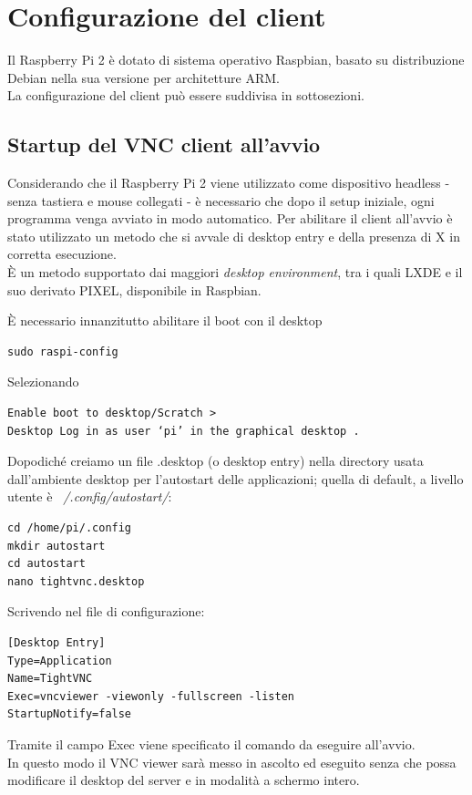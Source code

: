 \section{Configurazione del client}
Il Raspberry Pi 2 è dotato di sistema operativo Raspbian, basato su distribuzione Debian nella sua versione per architetture ARM. \\
La configurazione del client può essere suddivisa in sottosezioni.
\subsection{Startup del VNC client all'avvio}
Considerando che il Raspberry Pi 2 viene utilizzato come dispositivo headless - senza tastiera e mouse collegati - è necessario che dopo il setup iniziale, ogni programma venga avviato in modo automatico. Per abilitare il client all'avvio è stato utilizzato un metodo che si avvale di desktop entry e della presenza di X in corretta esecuzione.\\
È un metodo supportato dai maggiori \textit{desktop environment}, tra i quali LXDE e il suo derivato PIXEL, disponibile in Raspbian.

\noindent È necessario innanzitutto abilitare il boot con il desktop
\begin{lstlisting}
sudo raspi-config
\end{lstlisting}

\noindent Selezionando
\begin{verbatim}
Enable boot to desktop/Scratch >
Desktop Log in as user ‘pi’ in the graphical desktop .
\end{verbatim}

\noindent Dopodiché creiamo un file .desktop (o desktop entry) nella directory usata dall'ambiente desktop per l'autostart delle applicazioni; quella di default, a livello utente è \textit{~/.config/autostart/}:
\begin{lstlisting}
cd /home/pi/.config
mkdir autostart
cd autostart
nano tightvnc.desktop
\end{lstlisting}

Scrivendo nel file di configurazione:

\begin{lstlisting}
[Desktop Entry]
Type=Application
Name=TightVNC
Exec=vncviewer -viewonly -fullscreen -listen
StartupNotify=false
\end{lstlisting}

Tramite il campo Exec viene specificato il comando da eseguire all'avvio.\\
In questo modo il VNC viewer sarà messo in ascolto ed eseguito senza che possa modificare il desktop del server e in modalità a schermo intero.

